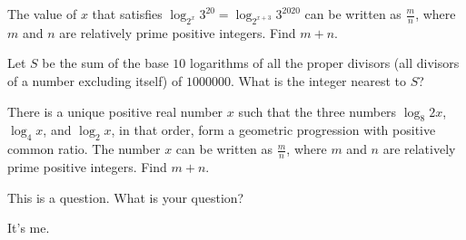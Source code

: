 \documentclass[11pt]{scrartcl}
\begin{document}
\begin{exercisebox}
\begin{exercise}[AIME II 2020/3]
The value of $x$ that satisfies $\log_{2^x} 3^{20} = \log_{2^{x+3}} 3^{2020}$ can be written as $\frac{m}{n}$, where $m$ and $n$ are relatively prime positive integers. Find $m+n$.
\end{exercise}
\begin{exercise}[AIME 1986/8]
Let $S$ be the sum of the base $10$ logarithms of all the proper divisors (all divisors of a number excluding itself) of $1000000$. What is the integer nearest to $S$?
\end{exercise}
\begin{exercise}[AIME I 2020/2]
There is a unique positive real number $x$ such that the three numbers $\log_8{2x}$, $\log_4{x}$, and $\log_2{x}$, in that order, form a geometric progression with positive common ratio. The number $x$ can be written as $\frac{m}{n}$, where $m$ and $n$ are relatively prime positive integers. Find $m + n$.
\end{exercise}
\end{exercisebox}
\begin{question}
This is a question. What is your question?
\end{question}

\problems
{}




\begin{hardbox}
\end{hardbox}


\begin{Problem}[Hello]
It's me.
\end{Problem}
\end{document}

